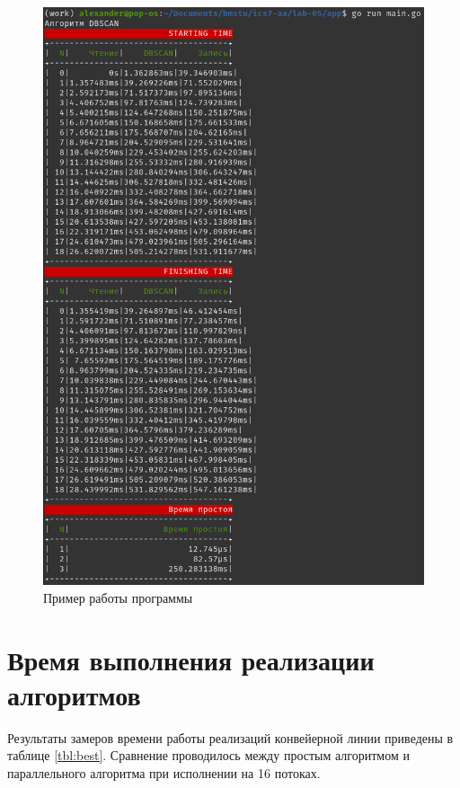 \begin{figure}[ht!]
	\begin{center}
		\captionsetup{singlelinecheck = false, justification=centerfirst}
		\includegraphics[scale=0.5]{assets/demon.png}
		\caption{Пример работы программы}
		\label{demonstration}
	\end{center}
	
	
\end{figure}

\newpage

\section{Время выполнения реализации алгоритмов}

Результаты замеров времени работы реализаций конвейерной линии приведены в таблице \ref{tbl:best}. 
Сравнение проводилось между простым алгоритмом и параллельного алгоритма при исполнении на 16 потоках.

